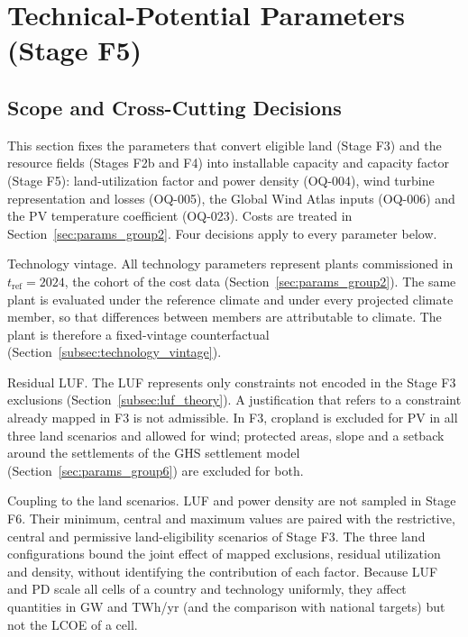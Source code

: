 
\section{Technical-Potential Parameters (Stage F5)}
\label{sec:params_group1}

\subsection{Scope and Cross-Cutting Decisions}
\label{subsec:g1_scope}

This section fixes the parameters that convert eligible land (Stage F3)
and the resource fields (Stages F2b and F4) into installable capacity and
capacity factor (Stage F5): land-utilization factor and power density
(OQ-004), wind turbine representation and losses (OQ-005), the Global
Wind Atlas inputs (OQ-006) and the PV temperature coefficient (OQ-023).
Costs are treated in Section~\ref{sec:params_group2}. Four decisions
apply to every parameter below.

Technology vintage. All technology parameters represent plants
commissioned in $t_{\mathrm{ref}}=2024$, the cohort of the cost data
(Section~\ref{sec:params_group2}). The same plant is evaluated
under the reference climate and under every projected climate member,
so that differences between members are attributable to climate. The
plant is therefore a fixed-vintage counterfactual
(Section~\ref{subsec:technology_vintage}).

Residual LUF. The LUF represents only constraints not encoded in the
Stage F3 exclusions (Section~\ref{subsec:luf_theory}). A justification
that refers to a constraint already mapped in F3 is not admissible. In
F3, cropland is excluded for PV in all three land scenarios and allowed
for wind; protected areas, slope and a setback around the settlements of
the GHS settlement model (Section~\ref{sec:params_group6}) are excluded
for both.

Coupling to the land scenarios. LUF and power density are not sampled in
Stage F6. Their minimum, central and maximum values are paired with the
restrictive, central and permissive land-eligibility scenarios of
Stage F3. The three land configurations bound the joint effect of mapped
exclusions, residual utilization and density, without identifying the
contribution of each factor. Because LUF and PD scale all cells of a
country and technology uniformly, they affect quantities in GW and
TWh/yr (and the comparison with national targets) but not the LCOE
of a cell.

